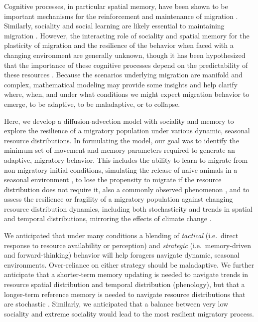 \documentclass[utf8]{frontiersSCNS} %
\begin{document}
	Cognitive processes, in particular spatial memory, have been shown to be important mechanisms for the reinforcement and maintenance of migration \citep{Merkle2019, Bauer2020}. Similarly, sociality and social learning are likely essential to maintaining migration \citep{Guttal2010, Fagan2011, Jesmer2018, Berdahl2018}.  However, the interacting role of sociality and spatial memory for the plasticity of migration and the resilience of the behavior when faced with a changing environment are generally unknown, though it has been hypothesized that the importance of these cognitive processes depend on the predictability of these resources \citep{RiotteLambert2020}. Because the scenarios underlying migration are manifold and complex, mathematical modeling may provide some insights and help clarify where, when, and under what conditions we might expect migration behavior to emerge, to be adaptive, to be maladaptive, or to collapse.

	Here, we develop a diffusion-advection model with sociality and memory to explore the resilience of a migratory population under various dynamic, seasonal resource distributions. In formulating the model, our goal was to identify the minimum set of movement and memory parameters required to generate an adaptive, migratory behavior. This includes the ability to learn to migrate from non-migratory initial conditions, simulating the release of naive animals in a seasonal environment \citep{Jesmer2018}, to lose the propensity to migrate if the resource distribution does not require it, also a commonly observed phenomenon \citep{Wilcove2008}, and to assess the resilience or fragility of a migratory population against changing resource distribution dynamics, including both stochasticity and trends in spatial and temporal distributions, mirroring the effects of climate change \citep{Park2020}.
	
	We anticipated that under many conditions a blending of \emph{tactical} (i.e.~direct response to resource availability or perception) and \emph{strategic} (i.e.~memory-driven and forward-thinking) behavior will help foragers navigate dynamic, seasonal environments. Over-reliance on either strategy should be maladaptive. We further anticipate that a shorter-term memory updating is needed to navigate trends in resource spatial distribution and temporal distribution (phenology), but that a longer-term reference memory is needed to navigate resource distributions that are stochastic \citep{Lin2021}. Similarly, we anticipated that a balance between very low sociality and extreme sociality would lead to the most resilient migratory process. 
	
\end{document}
